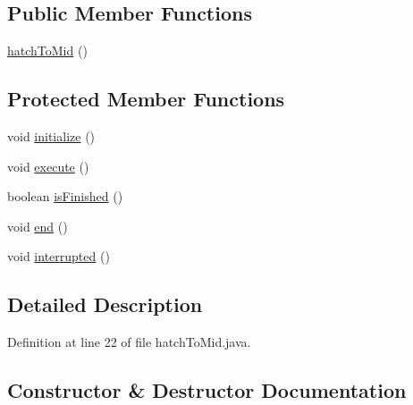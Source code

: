 \subsection*{Public Member Functions}
\begin{DoxyCompactItemize}
\item 
\mbox{\hyperlink{classorg_1_1usfirst_1_1frc3707_1_1_creedence_1_1commands_1_1hatch_to_mid_a1f4858a9e8cb922da3d5026eeb4651e5}{hatch\+To\+Mid}} ()
\end{DoxyCompactItemize}
\subsection*{Protected Member Functions}
\begin{DoxyCompactItemize}
\item 
void \mbox{\hyperlink{classorg_1_1usfirst_1_1frc3707_1_1_creedence_1_1commands_1_1hatch_to_mid_ade2601f7631795b3ef529ca08cf18b4a}{initialize}} ()
\item 
void \mbox{\hyperlink{classorg_1_1usfirst_1_1frc3707_1_1_creedence_1_1commands_1_1hatch_to_mid_a55baaab64e3e968232efb69334007e6f}{execute}} ()
\item 
boolean \mbox{\hyperlink{classorg_1_1usfirst_1_1frc3707_1_1_creedence_1_1commands_1_1hatch_to_mid_a6b9c92bb0bb28e802bd7dd1ba515e0d1}{is\+Finished}} ()
\item 
void \mbox{\hyperlink{classorg_1_1usfirst_1_1frc3707_1_1_creedence_1_1commands_1_1hatch_to_mid_af442234efc46fc2028412705db94cc5c}{end}} ()
\item 
void \mbox{\hyperlink{classorg_1_1usfirst_1_1frc3707_1_1_creedence_1_1commands_1_1hatch_to_mid_a43531674042b83e9effd7c6a2390b9ea}{interrupted}} ()
\end{DoxyCompactItemize}


\subsection{Detailed Description}


Definition at line 22 of file hatch\+To\+Mid.\+java.



\subsection{Constructor \& Destructor Documentation}
\mbox{\label{classorg_1_1usfirst_1_1frc3707_1_1_creedence_1_1commands_1_1hatch_to_mid_a1f4858a9e8cb922da3d5026eeb4651e5}} 
